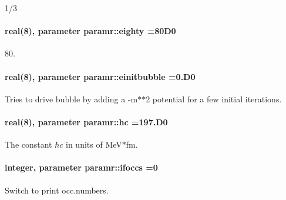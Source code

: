 1/3 

\paragraph[{\texorpdfstring{eighty}{eighty}}]{\setlength{\rightskip}{0pt plus 5cm}real(8), parameter paramr\+::eighty =80\+D0}\hypertarget{namespaceparamr_a193383fee42912673814402013918bb2}{}\label{namespaceparamr_a193383fee42912673814402013918bb2}


80. 

\paragraph[{\texorpdfstring{einitbubble}{einitbubble}}]{\setlength{\rightskip}{0pt plus 5cm}real(8), parameter paramr\+::einitbubble =0.\+D0}\hypertarget{namespaceparamr_a0c843211548f6ed84cee87900828e1bd}{}\label{namespaceparamr_a0c843211548f6ed84cee87900828e1bd}


Tries to drive bubble by adding a -\/m$\ast$$\ast$2 potential for a few initial iterations. 

\paragraph[{\texorpdfstring{hc}{hc}}]{\setlength{\rightskip}{0pt plus 5cm}real(8), parameter paramr\+::hc =197.\+D0}\hypertarget{namespaceparamr_ae307a42af690e6ee9306fffb321fac5f}{}\label{namespaceparamr_ae307a42af690e6ee9306fffb321fac5f}


The constant $ \hbar c $ in units of Me\+V$\ast$fm. 

\paragraph[{\texorpdfstring{ifoccs}{ifoccs}}]{\setlength{\rightskip}{0pt plus 5cm}integer, parameter paramr\+::ifoccs =0}\hypertarget{namespaceparamr_a198d0a4ec3820faf393944e71c1afc24}{}\label{namespaceparamr_a198d0a4ec3820faf393944e71c1afc24}


Switch to print occ.\+numbers. 

